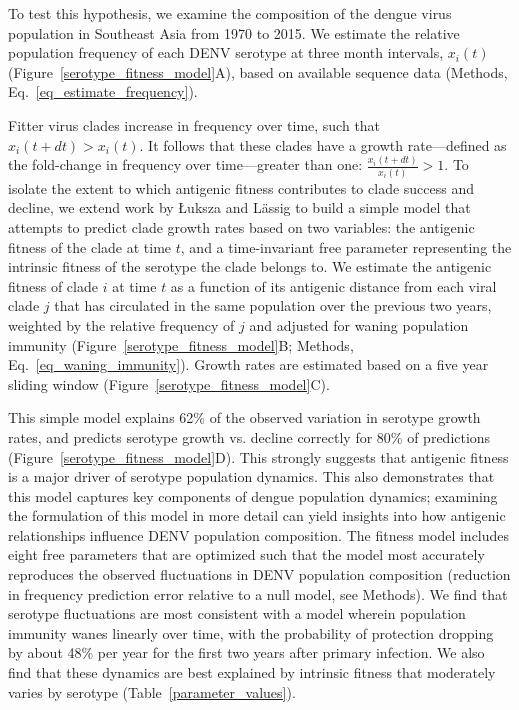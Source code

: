 \documentclass[11pt,oneside,letterpaper]{article}
\begin{document}
To test this hypothesis, we examine the composition of the dengue virus population in Southeast Asia from 1970 to 2015.
We estimate the relative population frequency of each DENV serotype at three month intervals, $x_i(t)$ (Figure~\ref{serotype_fitness_model}A), based on available sequence data (Methods, Eq.~\ref{eq_estimate_frequency}).

Fitter virus clades increase in frequency over time, such that $x_i(t+dt) > x_i(t)$.
It follows that these clades have a growth rate---defined as the fold-change in frequency over time---greater than one: $\frac{x_i(t+dt)}{x_i(t)} > 1$.
To isolate the extent to which antigenic fitness contributes to clade success and decline, we extend work by {\L}uksza and L\"assig  \citep{luksza2014predictive} to build a simple model that attempts to predict clade growth rates based on two variables: the antigenic fitness of the clade at time $t$, and a time-invariant free parameter representing the intrinsic fitness of the serotype the clade belongs to.
We estimate the antigenic fitness of clade $i$ at time $t$ as a function of its antigenic distance from each viral clade $j$ that has circulated in the same population over the previous two years, weighted by the relative frequency of $j$ and adjusted for waning population immunity (Figure~\ref{serotype_fitness_model}B; Methods, Eq.~\ref{eq_waning_immunity}).
Growth rates are estimated based on a five year sliding window (Figure~\ref{serotype_fitness_model}C).

This simple model explains 62\% of the observed variation in serotype growth rates, and predicts serotype growth vs. decline correctly for 80\% of predictions (Figure~\ref{serotype_fitness_model}D).
This strongly suggests that antigenic fitness is a major driver of serotype population dynamics.
This also demonstrates that this model captures key components of dengue population dynamics; examining the formulation of this model in more detail can yield insights into how antigenic relationships influence DENV population composition.
The fitness model includes eight free parameters that are optimized such that the model most accurately reproduces the observed fluctuations in DENV population composition (reduction in frequency prediction error relative to a null model, see Methods).
We find that serotype fluctuations are most consistent with a model wherein population immunity wanes linearly over time, with the probability of protection dropping by about 48\% per year for the first two years after primary infection.
We also find that these dynamics are best explained by intrinsic fitness that moderately varies by serotype (Table~\ref{parameter_values}).
\end{document}
